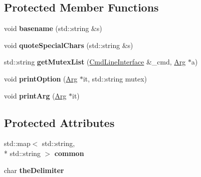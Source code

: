 \subsection*{Protected Member Functions}
\begin{DoxyCompactItemize}
\item 
\hypertarget{class_t_c_l_a_p_1_1_zsh_completion_output_a3fff80665ab8d6161de6451924c2b954}{void {\bfseries basename} (std\+::string \&s)}\label{class_t_c_l_a_p_1_1_zsh_completion_output_a3fff80665ab8d6161de6451924c2b954}

\item 
\hypertarget{class_t_c_l_a_p_1_1_zsh_completion_output_aacd678921212eb6654d7f704da360361}{void {\bfseries quote\+Special\+Chars} (std\+::string \&s)}\label{class_t_c_l_a_p_1_1_zsh_completion_output_aacd678921212eb6654d7f704da360361}

\item 
\hypertarget{class_t_c_l_a_p_1_1_zsh_completion_output_af3fceb65fc2c22ae8cc3c1df8a503184}{std\+::string {\bfseries get\+Mutex\+List} (\hyperlink{class_t_c_l_a_p_1_1_cmd_line_interface}{Cmd\+Line\+Interface} \&\+\_\+cmd, \hyperlink{class_t_c_l_a_p_1_1_arg}{Arg} $\ast$a)}\label{class_t_c_l_a_p_1_1_zsh_completion_output_af3fceb65fc2c22ae8cc3c1df8a503184}

\item 
\hypertarget{class_t_c_l_a_p_1_1_zsh_completion_output_a33903e3aef02f50799726eb7789fb4d4}{void {\bfseries print\+Option} (\hyperlink{class_t_c_l_a_p_1_1_arg}{Arg} $\ast$it, std\+::string mutex)}\label{class_t_c_l_a_p_1_1_zsh_completion_output_a33903e3aef02f50799726eb7789fb4d4}

\item 
\hypertarget{class_t_c_l_a_p_1_1_zsh_completion_output_a1d079ecf271977419432fb0caa72d035}{void {\bfseries print\+Arg} (\hyperlink{class_t_c_l_a_p_1_1_arg}{Arg} $\ast$it)}\label{class_t_c_l_a_p_1_1_zsh_completion_output_a1d079ecf271977419432fb0caa72d035}

\end{DoxyCompactItemize}
\subsection*{Protected Attributes}
\begin{DoxyCompactItemize}
\item 
\hypertarget{class_t_c_l_a_p_1_1_zsh_completion_output_aaa1f1d51a31c32ca28df97c951aaad81}{std\+::map$<$ std\+::string, \\*
std\+::string $>$ {\bfseries common}}\label{class_t_c_l_a_p_1_1_zsh_completion_output_aaa1f1d51a31c32ca28df97c951aaad81}

\item 
\hypertarget{class_t_c_l_a_p_1_1_zsh_completion_output_a170dd4ecb233984f3e2b6f853c82b1b0}{char {\bfseries the\+Delimiter}}\label{class_t_c_l_a_p_1_1_zsh_completion_output_a170dd4ecb233984f3e2b6f853c82b1b0}

\end{DoxyCompactItemize}


